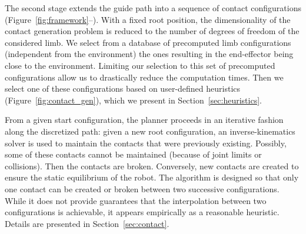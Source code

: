 The second stage extends the guide path into a sequence of contact configurations (Figure~\ref{fig:framework}--\Pb).
With a fixed root position, the dimensionality of the 
contact generation problem is reduced to the number of degrees of freedom of the considered limb. 
We select from a database of precomputed limb configurations (independent from the environment) the ones resulting in the end-effector being close to the environment.
Limiting our selection to this set of precomputed configurations allow us to drastically reduce the computation times. 
Then we select one of these configurations based on user-defined heuristics (Figure~\ref{fig:contact_gen}), which we present in Section~\ref{sec:heuristics}.

From a given start configuration, the planner proceeds in an iterative fashion along the discretized path: given a new root configuration, an inverse-kinematics solver 
is used to maintain the contacts that were previously existing. Possibly, some of these contacts cannot be maintained (because of joint limits or collisions).
Then the contacts are broken. Conversely, new contacts are created to ensure the static equilibrium of the robot.
The algorithm is designed so that only one contact can be created or broken between two successive configurations. While it does not provide guarantees that the interpolation between two configurations is achievable, it appears empirically as a reasonable heuristic.
Details are presented in Section~\ref{sec:contact}. 


